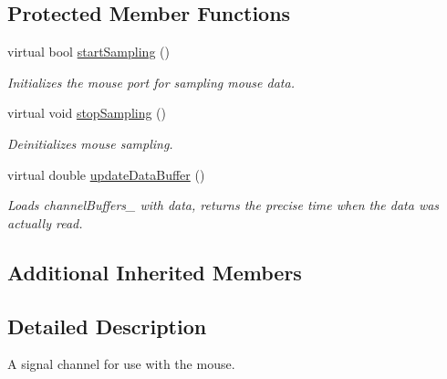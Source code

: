 \subsection*{Protected Member Functions}
\begin{DoxyCompactItemize}
\item 
virtual bool \hyperlink{class_picto_1_1_mouse_input_port_a7e13adbae6b3895e2f59edc0ee8ea822}{start\-Sampling} ()
\begin{DoxyCompactList}\small\item\em Initializes the mouse port for sampling mouse data. \end{DoxyCompactList}\item 
virtual void \hyperlink{class_picto_1_1_mouse_input_port_a4e10a7c9f34b0e5992061411e842e4dd}{stop\-Sampling} ()
\begin{DoxyCompactList}\small\item\em Deinitializes mouse sampling. \end{DoxyCompactList}\item 
virtual double \hyperlink{class_picto_1_1_mouse_input_port_a67e15a3e712644d7a1bd70dcba94d818}{update\-Data\-Buffer} ()
\begin{DoxyCompactList}\small\item\em Loads channel\-Buffers\-\_\- with data, returns the precise time when the data was actually read. \end{DoxyCompactList}\end{DoxyCompactItemize}
\subsection*{Additional Inherited Members}


\subsection{Detailed Description}
A signal channel for use with the mouse. 

